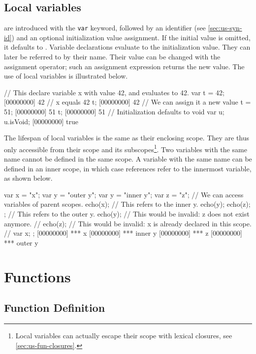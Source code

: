 \subsection{Local variables}

 are introduced with the \lstinline|var| keyword,
followed by an identifier (see \autoref{sec:us-syn-id}) and an optional
initialization value assignment. If the initial value is omitted, it
defaults to . Variable
declarations evaluate to
the initialization value. They can later be referred to by their
name. Their value can be changed with the assignment operator; such an
assignment expression returns the new value. The use of local
variables is illustrated below.

\begin{urbiscript}[firstnumber=last]
// This declare variable x with value 42, and evaluates to 42.
var t = 42;
[00000000] 42
// x equals 42
t;
[00000000] 42
// We can assign it a new value
t = 51;
[00000000] 51
t;
[00000000] 51
// Initialization defaults to void
var u;
u.isVoid;
[00000000] true
\end{urbiscript}

The lifespan of local variables is the same as their enclosing scope. They
are thus only accessible from their scope and its
subscopes\footnote{Local variables can actually escape their scope
  with lexical closures, see \autoref{sec:us-fun-closures}.}. Two
variables with the same name cannot be defined in the same scope. A
variable with the same name can be defined in an inner scope, in which
case references refer to the innermost variable, as shown below.

\begin{urbiscript}[firstnumber=last]
{
  var x = "x";
  var y = "outer y";
  {
    var y = "inner y";
    var z = "z";
    // We can access variables of parent scopes.
    echo(x);
    // This refers to the inner y.
    echo(y);
    echo(z);
  };
  // This refers to the outer y.
  echo(y);
  // This would be invalid: z does not exist anymore.
  // echo(z);
  // This would be invalid: x is already declared in this scope.
  // var x;
};
[00000000] *** x
[00000000] *** inner y
[00000000] *** z
[00000000] *** outer y
\end{urbiscript}


\section{Functions}

\subsection{Function Definition}


